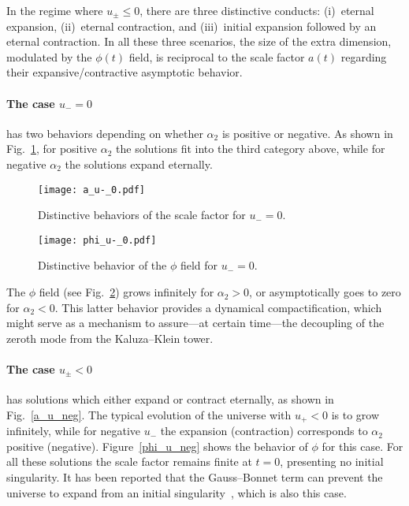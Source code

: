 \documentclass[aps,prd,12pt,superscriptaddress,showpacs,showkeys,reprint,nofootinbib]{revtex4-1}
\begin{document}
In the regime where $u_\pm \leq 0$, there are three distinctive conducts: (i)~eternal expansion, (ii)~eternal contraction, and (iii)~initial expansion followed by an eternal contraction. In all these three scenarios, the size of the extra dimension, modulated by the $\phi(t)$ field, is reciprocal to the scale factor $a(t)$ regarding their expansive/contractive asymptotic behavior.


\paragraph{The case $u_- = 0$} has two behaviors depending on whether $\alpha_2$ is positive or negative. As shown in Fig.~\ref{a_u_0}, for positive $\alpha_2$ the solutions fit into the third category above, while for negative $\alpha_2$ the solutions expand eternally. %
\begin{figure}[H]
  \texttt{[image: a\_u-\_0.pdf]} 
  \caption{Distinctive behaviors of the scale factor for $u_- = 0$.}
  \label{a_u_0}
\end{figure}
\begin{figure}[H]
  \texttt{[image: phi\_u-\_0.pdf]}
  \caption{Distinctive behavior of the $\phi$ field for $u_- = 0$.}
  \label{phi_u_0}
\end{figure}
The $\phi$ field (see Fig.~\ref{phi_u_0}) grows infinitely for $\alpha_2 > 0$, or asymptotically goes to zero for $\alpha_2 < 0$. This latter behavior provides a {dynamical} compactification, which might serve as a mechanism to assure---at certain time---the decoupling of the zeroth mode from the Kaluza--Klein tower.


\paragraph{The case $u_\pm < 0$} has solutions which either expand or contract eternally, as shown in Fig.~\ref{a_u_neg}. The typical evolution of the universe with $u_+ < 0$ is to grow infinitely, while for negative $u_-$ the expansion (contraction) corresponds to $\alpha_2$ positive (negative). Figure~\ref{phi_u_neg} shows the behavior of $\phi$ for this case. %
For all these solutions the scale factor remains finite at $t = 0$, presenting no initial singularity. It has been reported that the Gauss--Bonnet term can prevent the universe to expand from an initial singularity~\cite{Deruelle:1986iv,Henriques:1986jw,*Ishihara:1986if}, which is also this case.
\end{document}
